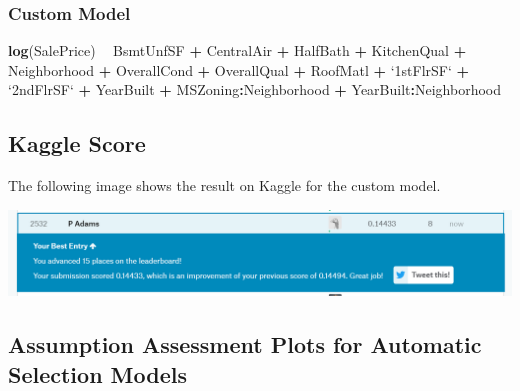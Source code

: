 \documentclass[american,]{article}
\newenvironment{Shaded}{\begin{snugshade}}{\end{snugshade}}
\newcommand{\DataTypeTok}[1]{\textcolor[rgb]{0.13,0.29,0.53}{#1}}
\newcommand{\KeywordTok}[1]{\textcolor[rgb]{0.13,0.29,0.53}{\textbf{#1}}}
\newcommand{\NormalTok}[1]{#1}
\newcommand{\OperatorTok}[1]{\textcolor[rgb]{0.81,0.36,0.00}{\textbf{#1}}}
\newcommand{\StringTok}[1]{\textcolor[rgb]{0.31,0.60,0.02}{#1}}
\begin{document}
\hypertarget{custom-model}{%
\subsubsection{Custom Model}\label{custom-model}}

\label{appendix:customSelection}

\begin{Shaded}
\begin{Highlighting}[]
\KeywordTok{log}\NormalTok{(SalePrice) }\OperatorTok{~}\StringTok{ }
\StringTok{            }\NormalTok{BsmtUnfSF }\OperatorTok{+}\StringTok{ }\NormalTok{CentralAir }\OperatorTok{+}\StringTok{ }\NormalTok{HalfBath }\OperatorTok{+}\StringTok{ }\NormalTok{KitchenQual }\OperatorTok{+}\StringTok{ }\NormalTok{Neighborhood }\OperatorTok{+}
\StringTok{            }\NormalTok{OverallCond }\OperatorTok{+}\StringTok{ }\NormalTok{OverallQual }\OperatorTok{+}\StringTok{ }\NormalTok{RoofMatl }\OperatorTok{+}\StringTok{ `}\DataTypeTok{1stFlrSF}\StringTok{`} \OperatorTok{+}\StringTok{ `}\DataTypeTok{2ndFlrSF}\StringTok{`} \OperatorTok{+}\StringTok{ }
\StringTok{            }\NormalTok{YearBuilt }\OperatorTok{+}\StringTok{ }\NormalTok{MSZoning}\OperatorTok{:}\NormalTok{Neighborhood }\OperatorTok{+}\StringTok{ }\NormalTok{YearBuilt}\OperatorTok{:}\NormalTok{Neighborhood}
\end{Highlighting}
\end{Shaded}

\hypertarget{kaggle-score}{%
\subsection{Kaggle Score}\label{kaggle-score}}

\label{appendix:kaggle}

The following image shows the result on Kaggle for the custom model.

\begin{center}\includegraphics[width=0.9\linewidth]{./Evidence for Model Score on Kaggle} \end{center}

\newpage

\hypertarget{assumption-assessment-plots-for-automatic-selection-models}{%
\subsection{Assumption Assessment Plots for Automatic Selection
Models}\label{assumption-assessment-plots-for-automatic-selection-models}}
\end{document}
